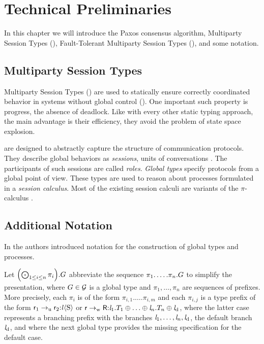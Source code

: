 \chapter{Technical Preliminaries}
In this chapter we will introduce the Paxos consensus algorithm, Multiparty Session Types (\MPST), Fault-Tolerant Multiparty Session Types (\FTMPST), and some notation.


\section{Multiparty Session Types}
Multiparty Session Types (\MPST) are used to statically ensure correctly coordinated behavior in systems without global control (\cite{hondaYoshidaCarbone16,CoppoEtal15}).
One important such property is progress, \ie the absence of deadlock. Like with every other static typing approach, the main advantage is their efficiency, \ie they avoid the problem of state space explosion.

\MPST are designed to abstractly capture the structure of communication protocols.
They describe global behaviors as \emph{sessions}, \ie units of
conversations \cite{hondaYoshidaCarbone16,BettiniEtal08,BocciEtal10}. The participants of such sessions are called \emph{roles}.
\emph{Global types} specify protocols from a global point of view.
These types are used to reason about processes formulated
in a \emph{session calculus}. Most of the existing session calculi are
variants of the $ \pi $-calculus \cite{MilnerParrowWalker92}.



\section{Additional Notation}
In \cite{PetersEtal21} the authors introduced notation for the construction of global types and processes.

Let $ {\left( \bigodot_{1 \leq i \leq n} \pi_i \right)}.\GT $ abbreviate the sequence $ \pi_1.\ldots.\pi_n.\GT $ to simplify the presentation, where $ \GT \in \globalTypes $ is a global type and $ \pi_1, \ldots, \pi_n $ are sequences of prefixes. More precisely, each $ \pi_i $ is of the form $ \pi_{i, 1}.\ldots.\pi_{i, m} $ and each $ \pi_{i, j} $ is a type prefix of the form $ \GComUS{\Role_1}{\Role_2}{\Label}{\Sort} $ or $ \GBranW{\Role}{\Role[R]}{\Label_1.\LT_1 \oplus \ldots \oplus \Label_n.\LT_n \oplus \LabelD} $, where the latter case represents a \weakR branching prefix with the branches $ \Label_1, \ldots, \Label_n, \LabelD $, the default branch $ \LabelD $, and where the next global type provides the missing specification for the default case.

